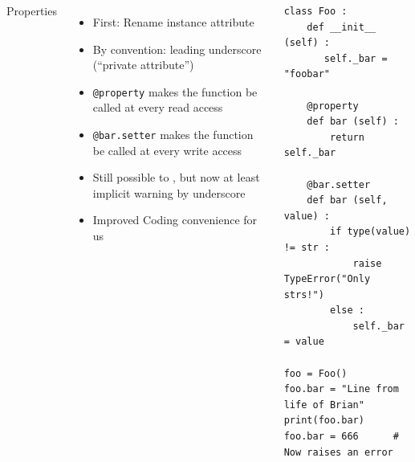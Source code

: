 \begin{frame}[fragile]
%
\begin{columns}[T]
\begin{Large}
	{Properties}
	\vspace{12pt}
\end{Large}
%
\begin{itemize}
\item First: Rename instance attribute
\item By convention: leading underscore (\enquote{private attribute})
\item \texttt{@property} makes the function be called at every read access
\item \texttt{@bar.setter} makes the function be called at every write access
\item Still possible to , but now at least implicit warning by underscore
\item Improved Coding convenience for us
\end{itemize}
%
\begin{codebox}
\begin{verbatim}
class Foo :
    def __init__ (self) :
       self._bar = "foobar"
   
    @property
    def bar (self) :
        return self._bar
   
    @bar.setter
    def bar (self, value) :
        if type(value) != str :
            raise TypeError("Only strs!")
        else :
            self._bar = value

foo = Foo()
foo.bar = "Line from life of Brian"
print(foo.bar)
foo.bar = 666      # Now raises an error
\end{verbatim}
\end{codebox}
\end{columns}
%
\end{frame}



